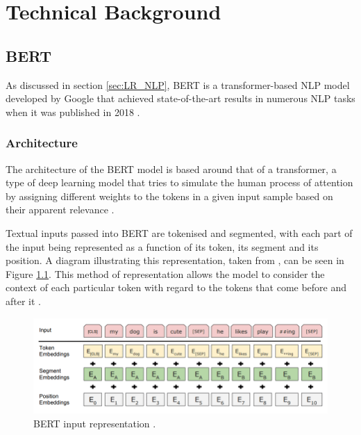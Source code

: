 \chapter{Technical Background} \label{sec:TBG}

\section{BERT} \label{sec:TBG_BERT}

As discussed in section \ref{sec:LR_NLP}, BERT is a transformer-based NLP model developed by Google that achieved state-of-the-art results in numerous NLP tasks when it was published in 2018 \cite{Devlin2018_BERT}.

\subsection{Architecture} \label{sec:TBG_BERT_Arch}

The architecture of the BERT model is based around that of a transformer, a type of deep learning model that tries to simulate the human process of attention by assigning different weights to the tokens in a given input sample based on their apparent relevance \cite{Bahdanau2014_Attention} \cite{sabharwal2021bert}.

Textual inputs passed into BERT are tokenised and segmented, with each part of the input being represented as a function of its token, its segment and its position. A diagram illustrating this representation, taken from \cite{Devlin2018_BERT}, can be seen in Figure \ref{fig:Explain_BERTEmbeddings}. This method of representation allows the model to consider the context of each particular token with regard to the tokens that come before and after it \cite{sabharwal2021bert}.

\begin{figure}[ht]
    \centering
    \includegraphics[scale=0.5]{figures/99_explanations/02_BERTEmbeddings.png}
    \caption{BERT input representation \cite{Devlin2018_BERT}.}
    \label{fig:Explain_BERTEmbeddings}
\end{figure}

